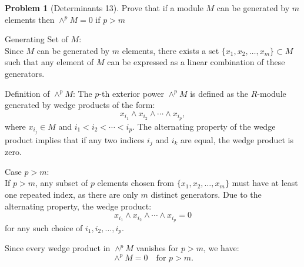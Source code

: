 \documentclass[12pt]{article}
\theoremstyle{definition}
\newtheorem{problem}{Problem}
\begin{document}
\begin{problem}[Determinants 13]
    Prove that if a module $M$ can be generated by $m$ elements then $\wedge^pM = 0$ if $p>m$

    \begin{solution}
        Generating Set of \( M \):\\
        Since \( M \) can be generated by \( m \) elements, there exists a set \( \{x_1, x_2, \ldots, x_m\} \subset M \) such that any element of \( M \) can be expressed as a linear combination of these generators.

        Definition of \( \wedge^p M \):  
        The \( p \)-th exterior power \( \wedge^p M \) is defined as the \( R \)-module generated by wedge products of the form:
        \[
        x_{i_1} \wedge x_{i_2} \wedge \cdots \wedge x_{i_p},
        \]
        where \( x_{i_j} \in M \) and \( i_1 < i_2 < \cdots < i_p \). The alternating property of the wedge product implies that if any two indices \( i_j \) and \( i_k \) are equal, the wedge product is zero.

        Case \( p > m \):\\  
        If \( p > m \), any subset of \( p \) elements chosen from \( \{x_1, x_2, \ldots, x_m\} \) must have at least one repeated index, as there are only \( m \) distinct generators. Due to the alternating property, the wedge product:
        \[
        x_{i_1} \wedge x_{i_2} \wedge \cdots \wedge x_{i_p} = 0
        \]
        for any such choice of \( i_1, i_2, \ldots, i_p \).
        
        Since every wedge product in \( \wedge^p M \) vanishes for \( p > m \), we have:
        \[
        \wedge^p M = 0 \quad \text{for } p > m.
        \]
    \end{solution}
\end{problem}
\end{document}
